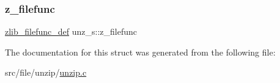 \mbox{\label{structunz__s_a7be6cd9deaecd46f98f462bf6594baf1}} 
\subsubsection{\texorpdfstring{z\+\_\+filefunc}{z\_filefunc}}
{\footnotesize\ttfamily \hyperlink{ioapi_8h_a269f2bded66a7ee4052a60025afebd7e}{zlib\+\_\+filefunc\+\_\+def} unz\+\_\+s\+::z\+\_\+filefunc}



The documentation for this struct was generated from the following file\+:\begin{DoxyCompactItemize}
\item 
src/file/unzip/\hyperlink{unzip_8c}{unzip.\+c}\end{DoxyCompactItemize}
